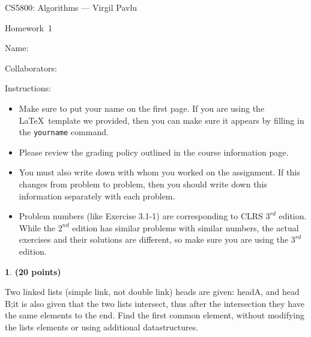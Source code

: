 \documentclass[11pt]{article}
\newcommand{\yourname}{}
\newcommand{\yourcollaborators}{}
\theoremstyle{definition}
\newcommand{\instructor}{Virgil Pavlu}
\newcommand{\hwnum}{1}
\newtheorem{prob}{}
\begin{document}
{\Large 
\begin{center}{CS5800: Algorithms} ---  \instructor \end{center}}
{\large
\vspace{10pt}
\noindent Homework~\hwnum \vspace{2pt}%
}

\bigskip
{\large \noindent Name: \yourname }

{\large \noindent Collaborators: \yourcollaborators}

\vspace{15pt}

{\large \noindent Instructions:}

\begin{itemize}

\item Make sure to put your name on the first page.  If you are using the \LaTeX~template we provided, then you can make sure it appears by filling in the \texttt{yourname} command.

\item Please review the grading policy outlined in the course information page.

\item You must also write down with whom you worked on the assignment.  If this changes from problem to problem, then you should write down this information separately with each problem.

\item Problem numbers (like Exercise 3.1-1) are corresponding to CLRS $3^{rd}$ edition.  While the  $2^{nd}$ edition  has  similar  problems  with  similar  numbers,  the  actual  exercises  and their solutions are different, so make sure you are using the $3^{rd}$ edition.

\end{itemize}

\newpage

\begin{prob} \textbf{(20 points)}
\end{prob}

Two linked lists (simple link, not double link) heads are given: headA, and head B;it is also given that the two lists intersect,  thus after the intersection they have the same elements to the end.  Find the first common element, without modifying the lists elements or using additional datastructures.
\end{document}
